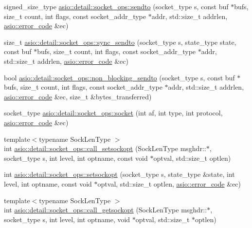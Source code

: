 \begin{DoxyCompactItemize}
\item 
signed\+\_\+size\+\_\+type \hyperlink{namespaceasio_1_1detail_1_1socket__ops_a6c94d5db7e79d8cbd014b22a8a9738ac}{asio\+::detail\+::socket\+\_\+ops\+::sendto} (socket\+\_\+type s, const buf $\ast$bufs, size\+\_\+t count, int flags, const socket\+\_\+addr\+\_\+type $\ast$addr, std\+::size\+\_\+t addrlen, \hyperlink{classasio_1_1error__code}{asio\+::error\+\_\+code} \&ec)
\item 
size\+\_\+t \hyperlink{namespaceasio_1_1detail_1_1socket__ops_a788b9314acf7829657952d9a40cccf50}{asio\+::detail\+::socket\+\_\+ops\+::sync\+\_\+sendto} (socket\+\_\+type s, state\+\_\+type state, const buf $\ast$bufs, size\+\_\+t count, int flags, const socket\+\_\+addr\+\_\+type $\ast$addr, std\+::size\+\_\+t addrlen, \hyperlink{classasio_1_1error__code}{asio\+::error\+\_\+code} \&ec)
\item 
bool \hyperlink{namespaceasio_1_1detail_1_1socket__ops_a4c9419f086a7aba64c1d6e1f470f5b79}{asio\+::detail\+::socket\+\_\+ops\+::non\+\_\+blocking\+\_\+sendto} (socket\+\_\+type s, const buf $\ast$bufs, size\+\_\+t count, int flags, const socket\+\_\+addr\+\_\+type $\ast$addr, std\+::size\+\_\+t addrlen, \hyperlink{classasio_1_1error__code}{asio\+::error\+\_\+code} \&ec, size\+\_\+t \&bytes\+\_\+transferred)
\item 
socket\+\_\+type \hyperlink{namespaceasio_1_1detail_1_1socket__ops_a90aa9a854148c26da8232e25988623d8}{asio\+::detail\+::socket\+\_\+ops\+::socket} (int af, int type, int protocol, \hyperlink{classasio_1_1error__code}{asio\+::error\+\_\+code} \&ec)
\item 
{\footnotesize template$<$typename Sock\+Len\+Type $>$ }\\int \hyperlink{namespaceasio_1_1detail_1_1socket__ops_acc4f63650d31eaa64dd3a57ab2b17471}{asio\+::detail\+::socket\+\_\+ops\+::call\+\_\+setsockopt} (Sock\+Len\+Type msghdr\+::$\ast$, socket\+\_\+type s, int level, int optname, const void $\ast$optval, std\+::size\+\_\+t optlen)
\item 
int \hyperlink{namespaceasio_1_1detail_1_1socket__ops_a5b40bf739bd762eda69c07d002702919}{asio\+::detail\+::socket\+\_\+ops\+::setsockopt} (socket\+\_\+type s, state\+\_\+type \&state, int level, int optname, const void $\ast$optval, std\+::size\+\_\+t optlen, \hyperlink{classasio_1_1error__code}{asio\+::error\+\_\+code} \&ec)
\item 
{\footnotesize template$<$typename Sock\+Len\+Type $>$ }\\int \hyperlink{namespaceasio_1_1detail_1_1socket__ops_a41aee30c7f0f19e721ff462a8c8e80c7}{asio\+::detail\+::socket\+\_\+ops\+::call\+\_\+getsockopt} (Sock\+Len\+Type msghdr\+::$\ast$, socket\+\_\+type s, int level, int optname, void $\ast$optval, std\+::size\+\_\+t $\ast$optlen)

\end{DoxyCompactItemize}
